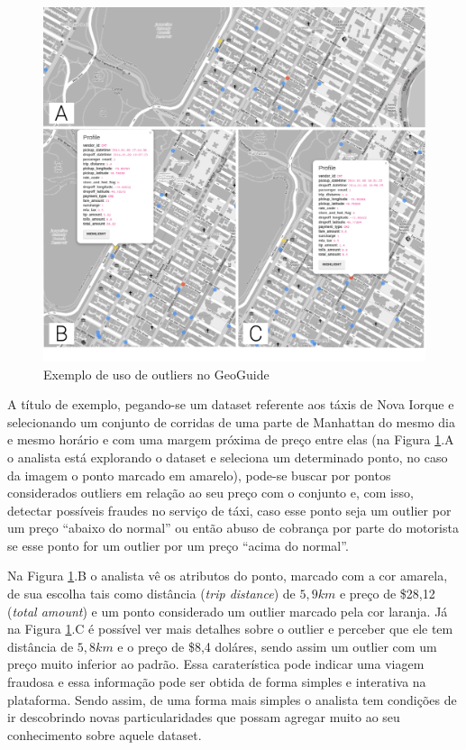 \begin{figure}[t]
	\centering
	\includegraphics[width=\textwidth]{images/outliers-geoguide.png}
	\caption{Exemplo de uso de outliers no GeoGuide}
	\label{fig:outliers-geoguide}
	\vspace{-10pt}
\end{figure}

A título de exemplo, pegando-se um dataset referente aos táxis de Nova Iorque e selecionando um conjunto de corridas de uma parte de Manhattan do mesmo dia e mesmo horário e com uma margem próxima de preço entre elas (na Figura \ref{fig:outliers-geoguide}.A o analista está explorando o dataset e seleciona um determinado ponto, no caso da imagem o ponto marcado em amarelo), pode-se buscar por pontos considerados outliers em relação ao seu preço com o conjunto e, com isso, detectar possíveis fraudes no serviço de táxi, caso esse ponto seja um outlier por um preço ``abaixo do normal'' ou então abuso de cobrança por parte do motorista se esse ponto for um outlier por um preço ``acima do normal''.

Na Figura \ref{fig:outliers-geoguide}.B o analista vê os atributos do ponto, marcado com a cor amarela, de sua escolha tais como distância (\textit{trip distance}) de $5,9km$ e preço de \$28,12  (\textit{total amount}) e um ponto considerado um outlier marcado pela cor laranja. Já na Figura \ref{fig:outliers-geoguide}.C é possível ver mais detalhes sobre o outlier e perceber que ele tem distância de $5,8km$ e o preço de \$8,4 doláres, sendo assim um outlier com um preço muito inferior ao padrão. Essa caraterística pode indicar uma viagem fraudosa e essa informação pode ser obtida de forma simples e interativa na plataforma. Sendo assim, de uma forma mais simples o analista tem condições de ir descobrindo novas particularidades que possam agregar muito ao seu conhecimento sobre aquele dataset.

